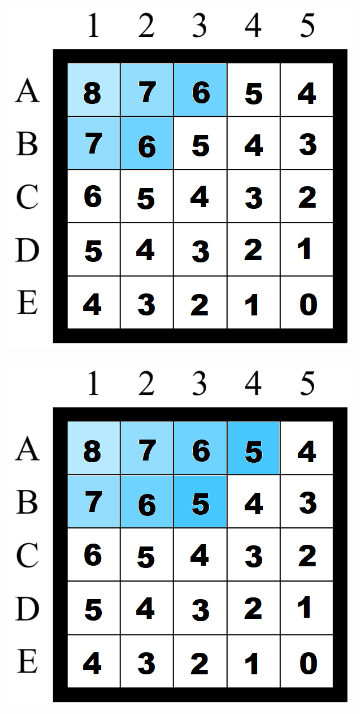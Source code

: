 \begin{figure}[H]
\begin{subfigure}[b]{.3\textwidth}
\end{subfigure}
\begin{subfigure}[b]{.3\textwidth}
  \centering
  \includegraphics[width=0.95\linewidth]{Report/Part2/g tie breaker/larger g/3.png}  
\end{subfigure}
\newline
\linebreak
\begin{subfigure}[b]{.3\textwidth}
  \centering
  \includegraphics[width=0.95\linewidth]{Report/Part2/g tie breaker/larger g/4.png}  

\end{subfigure}
\end{figure}
